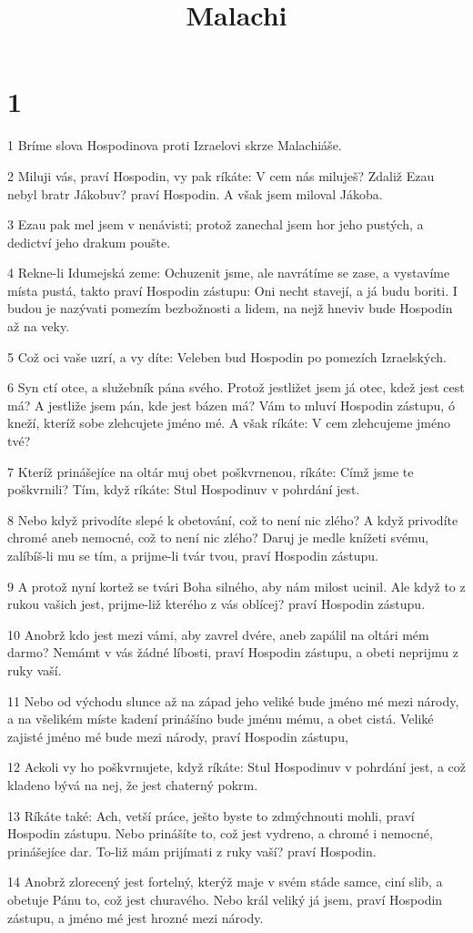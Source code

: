 

\title{Malachi}

\chapter{1}

\par 1 Bríme slova Hospodinova proti Izraelovi skrze Malachiáše.
\par 2 Miluji vás, praví Hospodin, vy pak ríkáte: V cem nás miluješ? Zdaliž Ezau nebyl bratr Jákobuv? praví Hospodin. A však jsem miloval Jákoba.
\par 3 Ezau pak mel jsem v nenávisti; protož zanechal jsem hor jeho pustých, a dedictví jeho drakum poušte.
\par 4 Rekne-li Idumejská zeme: Ochuzenit jsme, ale navrátíme se zase, a vystavíme místa pustá, takto praví Hospodin zástupu: Oni necht stavejí, a já budu boriti. I budou je nazývati pomezím bezbožnosti a lidem, na nejž hneviv bude Hospodin až na veky.
\par 5 Což oci vaše uzrí, a vy díte: Veleben bud Hospodin po pomezích Izraelských.
\par 6 Syn ctí otce, a služebník pána svého. Protož jestližet jsem já otec, kdež jest cest má? A jestliže jsem pán, kde jest bázen má? Vám to mluví Hospodin zástupu, ó kneží, kteríž sobe zlehcujete jméno mé. A však ríkáte: V cem zlehcujeme jméno tvé?
\par 7 Kteríž prinášejíce na oltár muj obet poškvrnenou, ríkáte: Címž jsme te poškvrnili? Tím, když ríkáte: Stul Hospodinuv v pohrdání jest.
\par 8 Nebo když privodíte slepé k obetování, což to není nic zlého? A když privodíte chromé aneb nemocné, což to není nic zlého? Daruj je medle knížeti svému, zalíbíš-li mu se tím, a prijme-li tvár tvou, praví Hospodin zástupu.
\par 9 A protož nyní kortež se tvári Boha silného, aby nám milost ucinil. Ale když to z rukou vašich jest, prijme-liž kterého z vás oblícej? praví Hospodin zástupu.
\par 10 Anobrž kdo jest mezi vámi, aby zavrel dvére, aneb zapálil na oltári mém darmo? Nemámt v vás žádné líbosti, praví Hospodin zástupu, a obeti neprijmu z ruky vaší.
\par 11 Nebo od východu slunce až na západ jeho veliké bude jméno mé mezi národy, a na všelikém míste kadení prinášíno bude jménu mému, a obet cistá. Veliké zajisté jméno mé bude mezi národy, praví Hospodin zástupu,
\par 12 Ackoli vy ho poškvrnujete, když ríkáte: Stul Hospodinuv v pohrdání jest, a což kladeno bývá na nej, že jest chaterný pokrm.
\par 13 Ríkáte také: Ach, vetší práce, ješto byste to zdmýchnouti mohli, praví Hospodin zástupu. Nebo prinášíte to, což jest vydreno, a chromé i nemocné, prinášejíce dar. To-liž mám prijímati z ruky vaší? praví Hospodin.
\par 14 Anobrž zlorecený jest fortelný, kterýž maje v svém stáde samce, ciní slib, a obetuje Pánu to, což jest churavého. Nebo král veliký já jsem, praví Hospodin zástupu, a jméno mé jest hrozné mezi národy.


